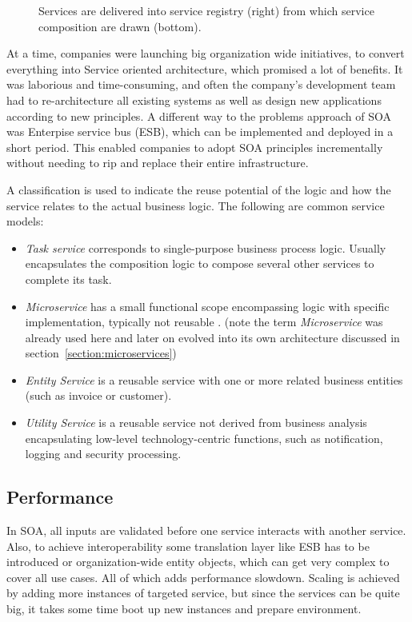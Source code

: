 \begin{figure}
    \centering
    
    \caption{Services are delivered into service registry (right) from which service composition are drawn (bottom). \label{img:soa_architecture}}
\end{figure}

At a time, companies were launching big organization wide initiatives, to convert everything into Service oriented architecture, which promised a lot of benefits. It was laborious and time-consuming, and often the company's development team had to re-architecture all existing systems as well as design new applications according to new principles. A different way to the problems approach of SOA was Enterpise service bus (ESB), which can be implemented and deployed in a short period. This enabled companies to adopt SOA principles incrementally without needing to rip and replace their entire infrastructure. \cite{ESB_VS_SOA}

A classification is used to indicate the reuse potential of the logic and how the service relates to the actual business logic. The following are common service models:
\begin{itemize}
    \item \textit{Task service} corresponds to single-purpose business process logic. Usually encapsulates the composition logic to compose several other services to complete its task. \cite{ESB_VS_SOA}
    \item \textit{Microservice} has a small functional scope encompassing logic with specific implementation, typically not reusable \cite{ESB_VS_SOA}. (note the term \textit{Microservice} was already used here and later on evolved into its own architecture discussed in section~\ref{section:microservices})
    \item \textit{Entity Service} is a reusable service with one or more related business entities (such as invoice or customer). \cite{ESB_VS_SOA}
    \item \textit{Utility Service} is a reusable service not derived from business analysis encapsulating low-level technology-centric functions, such as notification, logging and security processing. \cite{ESB_VS_SOA}
\end{itemize}


\subsection{Performance}
In SOA, all inputs are validated before one service interacts with another service. Also, to achieve interoperability some translation layer like ESB has to be introduced or organization-wide entity objects, which can get very complex to cover all use cases. All of which adds performance slowdown. Scaling is achieved by adding more instances of targeted service, but since the services can be quite big, it takes some time boot up new instances and prepare environment.

